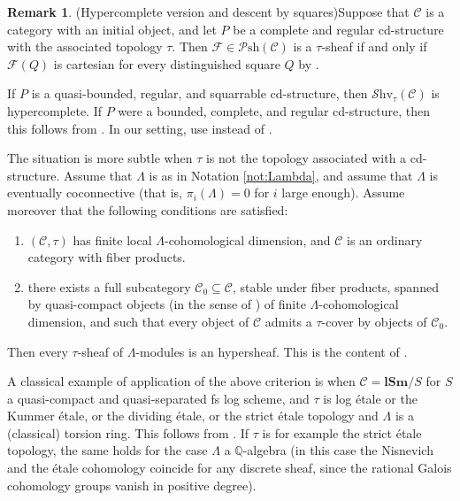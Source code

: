 \documentclass[11pt, a4paper]{amsart}
\theoremstyle{definition}
\newtheorem{rmk}[thm]{Remark}
\numberwithin{equation}{subsection}
\newcommand{\lSm}{\mathbf{lSm}}
\newcommand{\cC}{\mathcal{C}}
\newcommand{\cF}{\mathcal{F}}
\newcommand{\infPsh}{\mathcal{P}\mathrm{sh}}
\newcommand{\infShv}{\mathcal{S}\mathrm{hv}}
\newcommand{\infC}{\mathcal{C}}
\begin{document}
 
\begin{rmk}(Hypercomplete version and descent by squares)\label{logH.21} Suppose that $\cC$ is a category with an initial object, and let $P$ be a complete and regular cd-structure with the associated topology $\tau$. Then $\cF\in \infPsh(\cC)$ is a $\tau$-sheaf if and only if $\cF(Q)$ is cartesian for every distinguished square $Q$  by \cite[Corollary 5.10]{Vcdtop}.

If $P$ is a quasi-bounded, regular, and squarrable cd-structure,
then $\infShv_\tau(\cC)$ is hypercomplete.
If $P$ were a bounded, complete, and regular cd-structure, 
then this follows from \cite[Proposition 3.8(a),(b)]{Vcdtop}.
In our setting, use \cite[Lemma 3.4.10]{logDM} instead of \cite[Lemma 3.5]{Vcdtop}.

The situation is more subtle when $\tau$ is not the topology associated with a cd-structure. Assume that $\Lambda$ is as in Notation \ref{not:Lambda}, and assume  that $\Lambda$ is eventually coconnective (that is, $\pi_i(\Lambda)=0$ for $i$ large enough). Assume moreover that the following conditions are satisfied:
\begin{enumerate}
    \item $(\infC, \tau)$ has finite local $\Lambda$-cohomological dimension, and $\infC$ is an ordinary category  with fiber products.
    \item there exists a full subcategory $\infC_0\subseteq \infC$, stable under fiber products, spanned by quasi-compact objects (in the sense of \cite[Expos\'e VI, D\'efinitions 1.1]{SGA4}) of finite $\Lambda$-cohomological dimension, and such that every object of $\infC$ admits a $\tau$-cover by objects of $\infC_0$.\end{enumerate}
Then every $\tau$-sheaf of $\Lambda$-modules is an hypersheaf.
This is the content of \cite[Corollary 2.4.6]{AGV}.

A classical example of application of the above criterion is when $\infC=\lSm/S$ for $S$ a quasi-compact and quasi-separated fs log scheme, and $\tau$ is log \'etale or the Kummer \'etale, or the dividing \'etale, or the strict \'etale topology and $\Lambda$ is a (classical) torsion ring. This follows from \cite[Theorem 7.2]{NakayamaII}. If $\tau$ is for example the strict \'etale topology, the same holds for the case $\Lambda$ a $\mathbb{Q}$-algebra (in this case the Nisnevich and the \'etale cohomology coincide for any discrete sheaf, since the rational Galois cohomology groups vanish in positive degree).  
\end{rmk}
\end{document}

